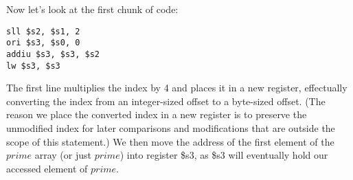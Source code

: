 \documentclass[11pt]{article}
\begin{document}
Now let's look at the first chunk of code:

\begin{verbatim}
sll $s2, $s1, 2
ori $s3, $s0, 0
addiu $s3, $s3, $s2
lw $s3, $s3
\end{verbatim}

The first line multiplies the index by 4 and places it in a new register, effectually converting the index from an integer-sized offset to a byte-sized offset. (The reason we place the converted index in a new register is to preserve the unmodified index for later comparisons and modifications that are outside the scope of this statement.) We then move the address of the first element of the $prime$ array (or just $prime$) into register \$s3, as \$s3 will eventually hold our accessed element of $prime$. 
\end{document}
